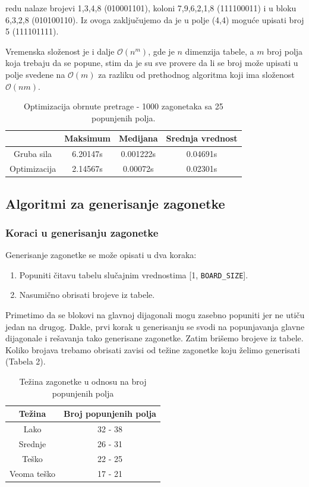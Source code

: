 \documentclass[a4paper]{article}
\begin{document}
    redu nalaze brojevi 1,3,4,8 (010001101), koloni 7,9,6,2,1,8 (111100011) i u bloku 6,3,2,8 (010100110). Iz ovoga zaključujemo da je u polje (4,4)
    moguće upisati broj 5 (111101111).
    \par Vremenska složenost je i dalje $\mathcal{O}(n^m)$, gde je $n$ dimenzija tabele, a $m$ broj polja koja trebaju da se popune, stim da je su sve provere da li se broj može upisati 
    u polje svedene na $\mathcal{O}(m)$ za razliku od prethodnog algoritma koji ima složenost $\mathcal{O}(nm)$.
    \begin{table}[h]
        \centering
        \begin{tabular}{ |c|c|c|c|}
            \hline
            & Maksimum & Medijana & Srednja vrednost \\
            \hline
            Gruba sila & 6.20147s & 0.001222s & 0.04691s \\
            \hline
            Optimizacija & 2.14567s & 0.00072s & 0.02301s \\
            \hline
        \end{tabular}
        \caption[Optimizacija obrnute pretrage]{Optimizacija obrnute pretrage - 1000 zagonetaka sa 25 popunjenih polja.}
    \end{table}

    \subsection{Algoritmi za generisanje zagonetke}
    \subsubsection{Koraci u generisanju zagonetke}
    Generisanje zagonetke se može opisati u dva koraka:
    \begin{enumerate}
        \item Popuniti čitavu tabelu slučajnim vrednostima [1, \texttt{BOARD\_SIZE}].
        \item Nasumično obrisati brojeve iz tabele.
    \end{enumerate}
    \par Primetimo da se blokovi na glavnoj dijagonali mogu zasebno popuniti jer ne utiču jedan na drugog. Dakle, prvi korak u generisanju se svodi na 
    popunjavanja glavne dijagonale i rešavanja tako generisane zagonetke. Zatim brišemo brojeve iz tabele. Koliko brojava trebamo obrisati zavisi od težine zagonetke
    koju želimo generisati (Tabela 2).
    \begin{table}[h]
        \centering
        \begin{tabular}{ | c | c |}
            \hline
            Težina & Broj popunjenih polja \\
            \hline
            Lako & 32 - 38\\
            \hline
            Srednje & 26 - 31\\
            \hline
            Teško & 22 - 25\\
            \hline
            Veoma teško & 17 - 21\\
            \hline
        \end{tabular}
        \caption{Težina zagonetke u odnosu na broj popunjenih polja}
    \end{table}
\end{document}
